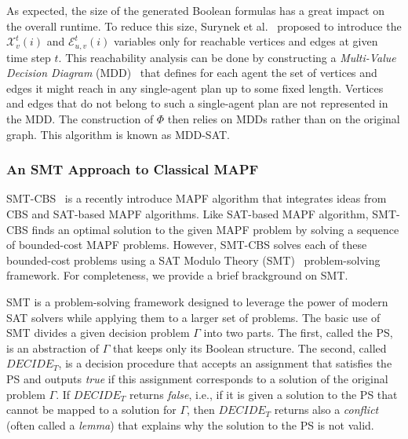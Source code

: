 \documentclass[review]{elsarticle}
\newcommand{\decidet}{\ensuremath{\mathit{DECIDE_T}}\xspace}
\newcommand\konstantin[1]{\nb{\textbf{Konstantin:}}{red}{#1}}
\newcommand\roni[1]{\nb{\textbf{Roni:}}{green}{#1}}
\newcommand{\smt}{\ac{SMT}\xspace}
\newcommand{\cbs}{\ac{CBS}\xspace}
\newcommand{\ps}{\ac{PS}\xspace}
\newcommand{\mddsat}{MDD-SAT\xspace}
\newcommand{\smtcbsO}{SMT-CBS\xspace} %
\newcommand{\mapf}{\ac{MAPF}\xspace}
\newcommand{\true}{\textit{true}\xspace}
\newcommand{\false}{\textit{false}\xspace}
\begin{document}
As expected, the size of the generated Boolean formulas has a great impact on the overall runtime. To reduce this size, Surynek et al.~\cite{DBLP:conf/ecai/KautzS92} proposed to introduce the $\mathcal{X}_{v}^{t}(i)$ and $\mathcal{E}_{u,v}^{t}(i)$ variables only for reachable vertices and edges at given time step $t$. This reachability analysis can be done by constructing a 
{\em Multi-Value Decision Diagram}  (MDD)~\cite{srinivasan1990algorithms}  that defines for each agent the set of vertices and edges it might reach in any single-agent plan up to some fixed length. Vertices and edges that do not belong to such a single-agent plan are not represented in the MDD. 
The construction of $\Phi$ then relies on MDDs rather than on the original graph. 
This algorithm is known as \mddsat. 





\subsubsection{An \smt Approach to Classical \mapf}


\smtcbsO~\cite{DBLP:conf/ijcai/Surynek19} is a recently introduce \mapf algorithm that integrates ideas from \cbs and SAT-based \mapf algorithms. 
Like SAT-based \mapf algorithm, \smtcbsO finds an optimal solution to the given \mapf problem by solving a sequence of bounded-cost \mapf problems. However, \smtcbsO solves each of these bounded-cost problems using a SAT Modulo Theory (SMT)~\cite{DBLP:journals/jacm/NieuwenhuisOT06,DBLP:journals/constraints/BofillPSV12,DBLP:conf/cp/Nieuwenhuis10} 
problem-solving framework. For completeness, we provide a brief brackground on \smt. 


\smt is a problem-solving framework 
designed to leverage the power of modern SAT solvers while applying them to a larger set of problems. 
The basic use of \smt divides a given decision problem $\Gamma$ into two parts. The first, called the \ps, is an abstraction of $\Gamma$ that keeps only its Boolean structure. The second, called \decidet, is a decision procedure that accepts an assignment that satisfies the \ps and outputs \true if this assignment corresponds to a solution of the original problem $\Gamma$. 
If \decidet returns \false, i.e., if it is given a solution to the \ps that cannot be mapped to a solution for $\Gamma$, then \decidet returns also a \emph{conflict}  (often called a {\em lemma}) that explains why the solution to the \ps is not valid. 
\end{document}
